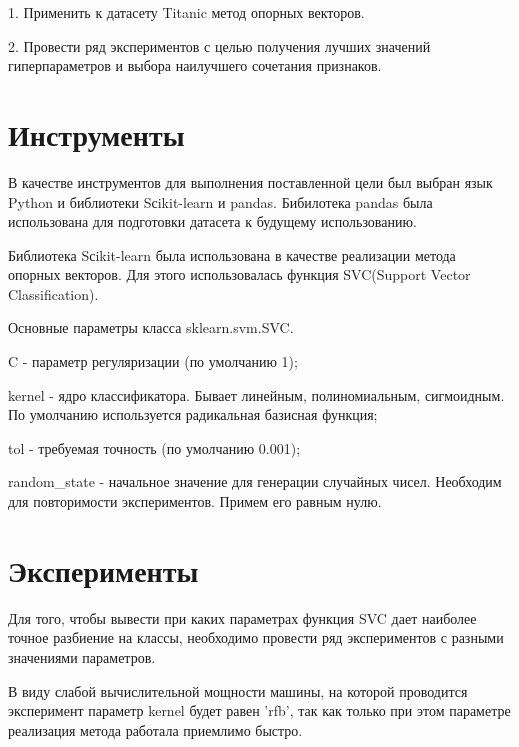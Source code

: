 \documentclass[a4paper,12pt]{article}
\begin{document}
	\vspace{0.5cm}
	1. Применить к датасету Titanic метод опорных векторов.
	
	\vspace{0.5cm}
	2. Провести ряд экспериментов с целью получения лучших значений гиперпараметров и выбора наилучшего сочетания признаков.
	
\newpage\section{Инструменты} 
	В качестве инструментов для выполнения поставленной цели был выбран язык Python и библиотеки Sсikit-learn и pandas.
	Бибилотека pandas была использована для подготовки датасета к будущему использованию.
	
	\vspace{0.5cm}
	Библиотека Sсikit-learn была использована  в качестве реализации метода опорных векторов. Для этого использовалась функция SVC(Support Vector Classification).  
	
	\vspace{0.5cm}
	Основные параметры класса sklearn.svm.SVC.
	
	\vspace{0.5cm}
	C - параметр регуляризации (по умолчанию 1);
	
	\vspace{0.5cm}
	kernel - ядро классификатора. Бывает линейным, полиномиальным, сигмоидным. По умолчанию используется радикальная базисная функция;
	
	\vspace{0.5cm}
	tol - требуемая точность (по умолчанию 0.001);
	
	
	\vspace{0.5cm}
	random\_state - начальное значение для генерации случайных чисел. Необходим для повторимости экспериментов. Примем его равным нулю.


	
\newpage\section{Эксперименты}
	Для того, чтобы вывести при каких параметрах функция SVC дает наиболее точное разбиение на классы, необходимо провести ряд экспериментов с разными значениями параметров. 
	
	\vspace{0.5cm}
	В виду слабой вычислительной мощности машины, на которой проводится эксперимент параметр  kernel будет равен 'rfb', так как только при этом параметре реализация метода работала приемлимо быстро.
	
\end{document}
